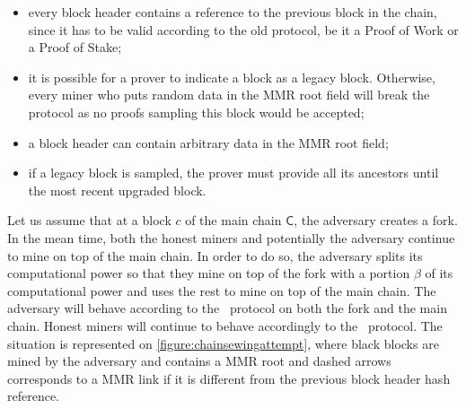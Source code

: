 \documentclass[11pt]{report}
\begin{document}
            \begin{itemize}
                \item every block header contains a reference to the previous block in the chain, since it has to be valid according to the old protocol, be it a Proof of Work or a Proof of Stake;
                \item it is possible for a prover to indicate a block as a legacy block. Otherwise, every miner who puts random data in the MMR root field will break the protocol as no proofs sampling this block would be accepted;
                \item a block header can contain arbitrary data in the MMR root field;
                \item if a legacy block is sampled, the prover must provide all its ancestors until the most recent upgraded block.
            \end{itemize}
            
            Let us assume that at a block \(c\) of the main chain \(\mathsf{C}\), the adversary creates a fork. In the mean time, both the honest miners and potentially the adversary continue to mine on top of the main chain. In order to do so, the adversary splits its computational power so that they mine on top of the fork with a portion \(\beta\) of its computational power and uses the rest to mine on top of the main chain. The adversary will behave according to the \FC\ protocol on both the fork and the main chain. Honest miners will continue to behave accordingly to the \FC\ protocol. The situation is represented on \autoref{figure:chainsewingattempt}, where black blocks are mined by the adversary and contains a MMR root and dashed arrows corresponds to a MMR link if it is different from the previous block header hash reference.
        
\end{document}
